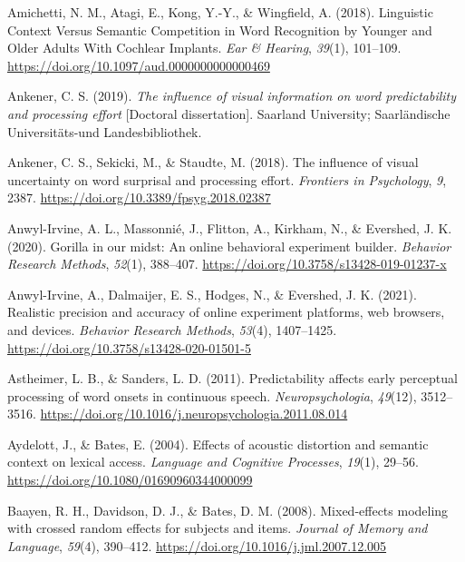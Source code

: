 \documentclass[a4paper, nobind]{templates/ociamthesis}
\newlength{\cslhangindent}
\newenvironment{CSLReferences}[2] %
 {%
  \setlength{\parindent}{0pt}
  \ifodd #1
  \let\oldpar\par
  \def\par{\hangindent=\cslhangindent\oldpar}
  \fi
  \setlength{\parskip}{1mm}
  \setlength{\baselineskip}{6mm}
 }%
 {}
\begin{document}
\begin{CSLReferences}{1}{0}
\leavevmode{}%
Amichetti, N. M., Atagi, E., Kong, Y.-Y., \& Wingfield, A. (2018). Linguistic Context Versus Semantic Competition in Word Recognition by Younger and Older Adults With Cochlear Implants. \emph{Ear \& Hearing}, \emph{39}(1), 101--109. \url{https://doi.org/10.1097/aud.0000000000000469}

\leavevmode{}%
Ankener, C. S. (2019). \emph{{The influence of visual information on word predictability and processing effort}} {[}Doctoral dissertation{]}. Saarland University; Saarl{ä}ndische Universit{ä}ts-und Landesbibliothek.

\leavevmode{}%
Ankener, C. S., Sekicki, M., \& Staudte, M. (2018). {The influence of visual uncertainty on word surprisal and processing effort}. \emph{Frontiers in Psychology}, \emph{9}, 2387. \url{https://doi.org/10.3389/fpsyg.2018.02387}

\leavevmode{}%
Anwyl-Irvine, A. L., Massonnié, J., Flitton, A., Kirkham, N., \& Evershed, J. K. (2020). {Gorilla in our midst: An online behavioral experiment builder}. \emph{Behavior Research Methods}, \emph{52}(1), 388--407. \url{https://doi.org/10.3758/s13428-019-01237-x}

\leavevmode{}%
Anwyl-Irvine, A., Dalmaijer, E. S., Hodges, N., \& Evershed, J. K. (2021). {Realistic precision and accuracy of online experiment platforms, web browsers, and devices}. \emph{Behavior Research Methods}, \emph{53}(4), 1407--1425. \url{https://doi.org/10.3758/s13428-020-01501-5}

\leavevmode{}%
Astheimer, L. B., \& Sanders, L. D. (2011). {Predictability affects early perceptual processing of word onsets in continuous speech}. \emph{Neuropsychologia}, \emph{49}(12), 3512--3516. \url{https://doi.org/10.1016/j.neuropsychologia.2011.08.014}

\leavevmode{}%
Aydelott, J., \& Bates, E. (2004). {Effects of acoustic distortion and semantic context on lexical access}. \emph{Language and Cognitive Processes}, \emph{19}(1), 29--56. \url{https://doi.org/10.1080/01690960344000099}

\leavevmode{}%
Baayen, R. H., Davidson, D. J., \& Bates, D. M. (2008). {Mixed-effects modeling with crossed random effects for subjects and items}. \emph{Journal of Memory and Language}, \emph{59}(4), 390--412. \url{https://doi.org/10.1016/j.jml.2007.12.005}


\end{CSLReferences}
\end{document}
